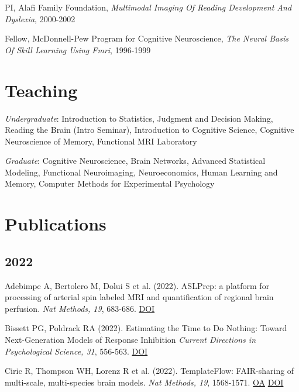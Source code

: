 \documentclass[10pt, letterpaper]{article}
\begin{document}
PI, Alafi Family Foundation, \textit{Multimodal Imaging Of Reading Development And Dyslexia}, 2000-2002 \vspace{2mm}

Fellow, McDonnell-Pew Program for Cognitive Neuroscience, \textit{The Neural Basis Of Skill Learning Using Fmri}, 1996-1999 \vspace{2mm}

\section*{Teaching}
\noindent

\textit{Undergraduate}: Introduction to Statistics, Judgment and Decision Making, Reading the Brain (Intro Seminar), Introduction to Cognitive Science, Cognitive Neuroscience of Memory, Functional MRI Laboratory \vspace{2mm}

\textit{Graduate}: Cognitive Neuroscience, Brain Networks, Advanced Statistical Modeling, Functional Neuroimaging, Neuroeconomics, Human Learning and Memory, Computer Methods for Experimental Psychology \vspace{2mm}

\section*{Publications}\subsection*{2022}Adebimpe A, Bertolero M, Dolui S et al. (2022). ASLPrep: a platform for processing of arterial spin labeled MRI and quantification of regional brain perfusion. \textit{Nat Methods, 19}, 683-686. \href{http://dx.doi.org/10.1038/s41592-022-01458-7}{DOI} \vspace{2mm}

Bissett PG, Poldrack RA (2022). Estimating the Time to Do Nothing: Toward Next-Generation Models of Response Inhibition \textit{Current Directions in Psychological Science, 31}, 556-563. \href{http://dx.doi.org/10.1177/09637214221121753}{DOI} \vspace{2mm}

Ciric R, Thompson WH, Lorenz R et al. (2022). TemplateFlow: FAIR-sharing of multi-scale, multi-species brain models. \textit{Nat Methods, 19}, 1568-1571. \href{https://www.ncbi.nlm.nih.gov/pmc/articles/PMC9718663}{OA} \href{http://dx.doi.org/10.1038/s41592-022-01681-2}{DOI} \vspace{2mm}
\end{document}
